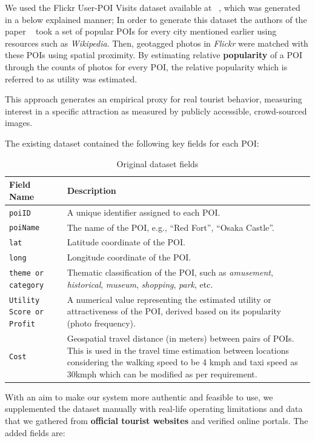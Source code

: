 \documentclass[sigconf,authordraft]{acmart}
\begin{document}
We used the Flickr User-POI Visits dataset available at ~\cite{limkwanhuiDataCode}, which was generated in a below explained manner; In order to generate this dataset the authors of the paper ~\cite{taylor2018tour} took a set of popular POIs for every city mentioned earlier using resources such as \textit{Wikipedia}. Then, geotagged photos in \textit{Flickr} were matched with these POIs using spatial proximity. By estimating relative \textbf{popularity} of a POI through the counts of photos for every POI, the relative popularity which is referred to as utility was estimated.

This approach generates an empirical proxy for real tourist behavior, measuring interest in a specific attraction as measured by publicly accessible, crowd-sourced images.

The existing dataset contained the following key fields for each POI:

\begin{table}[H]
\begin{tabularx}{0.5\textwidth}{p{3cm} X}
\hline
\textbf{Field Name} & \textbf{Description} \\
\hline
\texttt{poiID} & A unique identifier assigned to each POI. \\
\hline
\texttt{poiName} & The name of the POI, e.g., ``Red Fort'', ``Osaka Castle''. \\
\hline
\texttt{lat} & Latitude coordinate of the POI. \\
\hline
\texttt{long} & Longitude coordinate of the POI. \\
\hline
\texttt{theme or category} & Thematic classification of the POI, such as \textit{amusement}, \textit{historical}, \textit{museum}, \textit{shopping}, \textit{park}, etc. \\
\hline
\texttt{Utility Score or Profit} & A numerical value representing the estimated utility or attractiveness of the POI, derived based on its popularity (photo frequency). \\
\hline
\texttt{Cost} & Geospatial travel distance (in meters) between pairs of POIs. This is used in the travel time estimation between locations considering the walking speed to be 4 kmph and taxi speed as 30kmph which can be modified as per requirement. \\
\hline
\end{tabularx}
\caption{Original dataset fields}
\end{table}

With an aim to make our system more authentic and feasible to use, we supplemented the dataset manually with real-life operating limitations and data that we gathered from \textbf{official tourist websites} and verified online portals. The added fields are:
\end{document}
